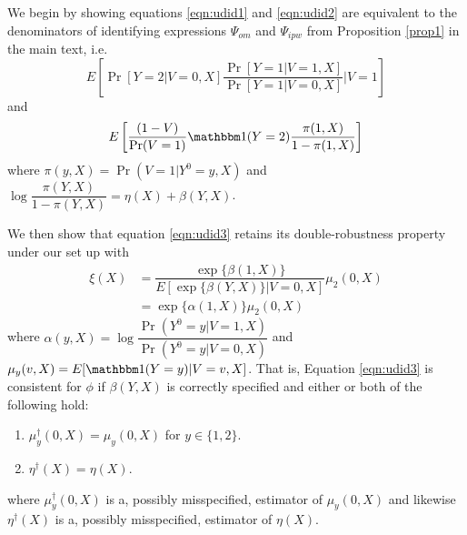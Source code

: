 \begin{appendix}
\begin{refsection}
We begin by showing equations \ref{eqn:udid1} and \ref{eqn:udid2} are equivalent to the denominators of identifying expressions $\Psi_{om}$ and $\Psi_{ipw}$ from Proposition \ref{prop1} in the main text, i.e.
 \begin{equation*}
        E\left[\Pr[Y = 2 | V = 0, X] \dfrac{\Pr[Y = 1 | V = 1, X]}{\Pr[Y = 1 | V = 0, X]} \Big| V = 1 \right]
    \end{equation*}
    and 
    \begin{equation*}
        E\left[ \dfrac{(1 - V)}{\Pr(V=1)} \mathbbm 1(Y = 2) \dfrac{\pi(1,X)}{1 - \pi(1,X)}\right]
    \end{equation*}
where $\pi(y, X) = \Pr(V = 1 | Y^0 = y, X)$ and $\log \dfrac{\pi(Y, X)}{1 - \pi(Y, X)} = \eta(X) + \beta(Y, X)$.

We then show that equation \ref{eqn:udid3} retains its double-robustness property under our set up with
    \begin{align*}
        \xi(X) &= \dfrac{\exp\{\beta(1,X)\}}{E[\exp\{\beta(Y,X)\} | V = 0, X]}\mu_2(0,X) \\
            &= \exp\{\alpha(1,X)\}\mu_2(0,X)
    \end{align*}
    where $\alpha(y, X) = \log \dfrac{\Pr(Y^0=y|V=1,X)}{\Pr(Y^0=y|V=0,X)}$ and $\mu_y(v,X) = E[\mathbbm 1 (Y= y) | V = v, X]$. That is, Equation \ref{eqn:udid3} is consistent for $\phi$ if $\beta(Y,X)$ is correctly specified and either or both of the following hold:
    \begin{enumerate}
        \item $\mu_y^\dagger(0,X) = \mu_y(0,X)$ for $y \in \{1, 2\}$.
        \item $\eta^\dagger(X) = \eta(X)$.
    \end{enumerate}
    where  $\mu_y^\dagger(0,X)$ is a, possibly misspecified, estimator of $\mu_y(0,X)$ and likewise $\eta^\dagger(X)$ is a, possibly misspecified, estimator of $\eta(X)$.


\end{refsection}
\end{appendix}
